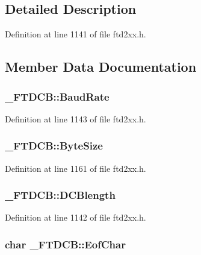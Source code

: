 \subsection{Detailed Description}


Definition at line 1141 of file ftd2xx.h.

\subsection{Member Data Documentation}
\hypertarget{struct__FTDCB_a3c59a8bdbb30e28505045b3186c89cbf}{
\subsubsection[{BaudRate}]{ {\bf \_\-FTDCB::BaudRate}}}
\label{struct__FTDCB_a3c59a8bdbb30e28505045b3186c89cbf}


Definition at line 1143 of file ftd2xx.h.\hypertarget{struct__FTDCB_a6c3cd5d1cae69a2051d8c83badc52780}{
\subsubsection[{ByteSize}]{ {\bf \_\-FTDCB::ByteSize}}}
\label{struct__FTDCB_a6c3cd5d1cae69a2051d8c83badc52780}


Definition at line 1161 of file ftd2xx.h.\hypertarget{struct__FTDCB_a0d577b6cc351abc8313fd7eeaf7a4468}{
\subsubsection[{DCBlength}]{ {\bf \_\-FTDCB::DCBlength}}}
\label{struct__FTDCB_a0d577b6cc351abc8313fd7eeaf7a4468}


Definition at line 1142 of file ftd2xx.h.\hypertarget{struct__FTDCB_a6f0a84ef54dbc36123a40e05ba94aa4e}{
\subsubsection[{EofChar}]{\setlength{\rightskip}{0pt plus 5cm}char {\bf \_\-FTDCB::EofChar}}}
\label{struct__FTDCB_a6f0a84ef54dbc36123a40e05ba94aa4e}


